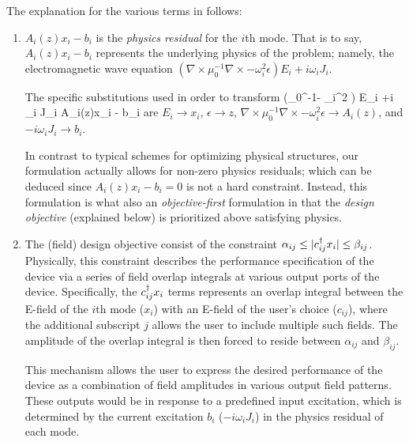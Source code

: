 The explanation for the various terms in  follows:
\begin{enumerate}
\item 
    $A_i(z)x_i - b_i$ is the \emph{physics residual} for the $i$th mode.
    That is to say, $A_i(z)x_i - b_i$ represents the underlying physics
        of the problem; namely, the electromagnetic wave equation
        \mbox{$(\nabla\times\mu_0^{-1}\nabla\times - \omega_i^2 \epsilon) E_i 
            +i \omega_i J_i $}.

    The specific substitutions used in order to transform
        \BE (\nabla\times\mu_0^{-1}\nabla\times - \omega_i^2 \epsilon) E_i 
            +i \omega_i J_i  \quad\longrightarrow\quad A_i(z)x_i - b_i \EE
        are
    \BI $E_i \to x_i$,
    \I  $\epsilon \to z$,
    \I  $\nabla\times\mu_0^{-1}\nabla\times - \omega_i^2 \epsilon \to A_i(z)$, and
    \I  $ -i\omega_i J_i \to b_i$.  \EI

    In contrast to typical schemes for optimizing physical structures,
        our formulation actually allows for non-zero physics residuals;
        which can be deduced since $A_i(z)x_i-b_i=0$ is not a hard constraint.
    Instead, this formulation is what also an \emph{objective-first} \cite{ob1_wg}
        formulation in that the \emph{design objective} (explained below)
        is prioritized above satisfying physics.

\item
    The (field) design objective consist of 
        the constraint $\alpha_{ij} \le |c_{ij}^\dagger x_i| \le \beta_{ij}$.
    Physically, this constraint describes 
        the performance specification of the device 
        via a series of field overlap integrals 
        at various output ports of the device.
    Specifically, the $c_{ij}^\dagger x_i$ terms represents an overlap integral between
        the E-field of the $i$th mode ($x_i$)
        with an E-field of the user's choice ($c_{ij}$),
        where the additional subscript $j$ allows the user
        to include multiple such fields.
    The amplitude of the overlap integral is then forced to reside between
        $\alpha_{ij}$ and $\beta_{ij}$.

    This mechanism allows the user to express 
        the desired performance of the device
        as a combination of field amplitudes in various output field patterns.
    These outputs would be in response to a predefined input excitation,
        which is determined by the current excitation $b_i$ ($-i\omega_i J_i$)
        in the physics residual of each mode.


\end{enumerate}
